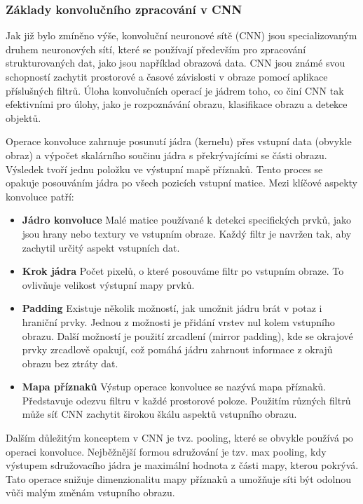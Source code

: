 \documentclass[male,czech,api_ing]{thesis}
\begin{document}
\subsubsection{Základy konvolučního zpracování v CNN}
Jak již bylo zmíněno výše, konvoluční neuronové sítě (CNN) jsou specializovaným druhem neuronových sítí, které se používají především pro zpracování strukturovaných dat, jako jsou například obrazová data. CNN jsou známé svou schopností zachytit prostorové a časové závislosti v obraze pomocí aplikace příslušných filtrů. Úloha konvolučních operací je jádrem toho, co činí CNN tak efektivními pro úlohy, jako je rozpoznávání obrazu, klasifikace obrazu a detekce objektů.

Operace konvoluce zahrnuje posunutí jádra (kernelu) přes vstupní data (obvykle obraz) a výpočet skalárního součinu jádra s překrývajícími se části obrazu. Výsledek tvoří jednu položku ve výstupní mapě příznaků. Tento proces se opakuje posouváním jádra po všech pozicích vstupní matice. Mezi klíčové aspekty konvoluce patří:

\begin{itemize}
    \item \textbf{Jádro konvoluce} Malé matice používané k detekci specifických prvků, jako jsou hrany nebo textury ve vstupním obraze. Každý filtr je navržen tak, aby zachytil určitý aspekt vstupních dat.
    \item \textbf{Krok jádra} Počet pixelů, o které posouváme filtr po vstupním obraze. To ovlivňuje velikost výstupní mapy prvků.
    \item \textbf{Padding} Existuje několik možností, jak umožnit jádru brát v potaz i hraniční prvky. Jednou z možnosti je přidání vrstev nul kolem vstupního obrazu. Další možností je použití zrcadlení (mirror padding), kde se okrajové prvky zrcadlově opakují, což pomáhá jádru zahrnout informace z okrajů obrazu bez ztráty dat.
    \item \textbf{Mapa příznaků} Výstup operace konvoluce se nazývá mapa příznaků. Představuje odezvu filtru v každé prostorové poloze. Použitím různých filtrů může síť CNN zachytit širokou škálu aspektů vstupního obrazu.
\end{itemize}

Dalším důležitým konceptem v CNN je tvz. pooling, které se obvykle používá po operaci konvoluce. Nejběžnější formou sdružování je tzv. max pooling, kdy výstupem sdružovacího jádra je maximální hodnota z části mapy, kterou pokrývá. Tato operace snižuje dimenzionalitu mapy příznaků a umožňuje síti být odolnou vůči malým změnám vstupního obrazu.
\end{document}
